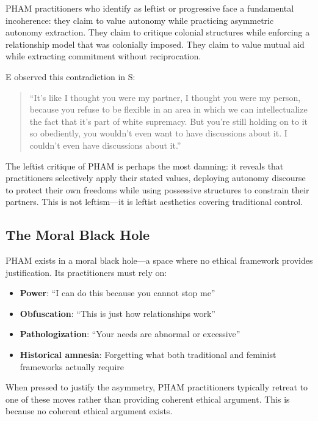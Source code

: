 \documentclass[12pt, letterpaper]{article}
\begin{document}
PHAM practitioners who identify as leftist or progressive face a fundamental incoherence: they claim to value autonomy while practicing asymmetric autonomy extraction. They claim to critique colonial structures while enforcing a relationship model that was colonially imposed. They claim to value mutual aid while extracting commitment without reciprocation.

E observed this contradiction in S:

\begin{quote}
``It's like I thought you were my partner, I thought you were my person, because you refuse to be flexible in an area in which we can intellectualize the fact that it's part of white supremacy. But you're still holding on to it so obediently, you wouldn't even want to have discussions about it. I couldn't even have discussions about it.''
\end{quote}

The leftist critique of PHAM is perhaps the most damning: it reveals that practitioners selectively apply their stated values, deploying autonomy discourse to protect their own freedoms while using possessive structures to constrain their partners. This is not leftism---it is leftist aesthetics covering traditional control.

\subsection{The Moral Black Hole}

PHAM exists in a moral black hole---a space where no ethical framework provides justification. Its practitioners must rely on:

\begin{itemize}
    \item \textbf{Power}: ``I can do this because you cannot stop me''
    \item \textbf{Obfuscation}: ``This is just how relationships work''
    \item \textbf{Pathologization}: ``Your needs are abnormal or excessive''
    \item \textbf{Historical amnesia}: Forgetting what both traditional and feminist frameworks actually require
\end{itemize}

When pressed to justify the asymmetry, PHAM practitioners typically retreat to one of these moves rather than providing coherent ethical argument. This is because no coherent ethical argument exists.
\end{document}
